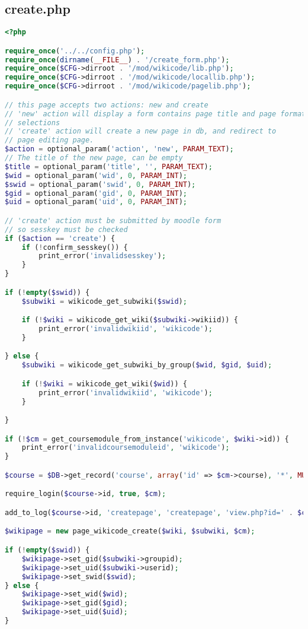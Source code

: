 \subsection{create.php}
\begin{lstlisting}[language=PHP]
<?php

require_once('../../config.php');
require_once(dirname(__FILE__) . '/create_form.php');
require_once($CFG->dirroot . '/mod/wikicode/lib.php');
require_once($CFG->dirroot . '/mod/wikicode/locallib.php');
require_once($CFG->dirroot . '/mod/wikicode/pagelib.php');

// this page accepts two actions: new and create
// 'new' action will display a form contains page title and page format
// selections
// 'create' action will create a new page in db, and redirect to
// page editing page.
$action = optional_param('action', 'new', PARAM_TEXT);
// The title of the new page, can be empty
$title = optional_param('title', '', PARAM_TEXT);
$wid = optional_param('wid', 0, PARAM_INT);
$swid = optional_param('swid', 0, PARAM_INT);
$gid = optional_param('gid', 0, PARAM_INT);
$uid = optional_param('uid', 0, PARAM_INT);

// 'create' action must be submitted by moodle form
// so sesskey must be checked
if ($action == 'create') {
    if (!confirm_sesskey()) {
        print_error('invalidsesskey');
    }
}

if (!empty($swid)) {
    $subwiki = wikicode_get_subwiki($swid);

    if (!$wiki = wikicode_get_wiki($subwiki->wikiid)) {
        print_error('invalidwikiid', 'wikicode');
    }

} else {
    $subwiki = wikicode_get_subwiki_by_group($wid, $gid, $uid);

    if (!$wiki = wikicode_get_wiki($wid)) {
        print_error('invalidwikiid', 'wikicode');
    }

}

if (!$cm = get_coursemodule_from_instance('wikicode', $wiki->id)) {
    print_error('invalidcoursemoduleid', 'wikicode');
}

$course = $DB->get_record('course', array('id' => $cm->course), '*', MUST_EXIST);

require_login($course->id, true, $cm);

add_to_log($course->id, 'createpage', 'createpage', 'view.php?id=' . $cm->id, $wiki->id);

$wikipage = new page_wikicode_create($wiki, $subwiki, $cm);

if (!empty($swid)) {
    $wikipage->set_gid($subwiki->groupid);
    $wikipage->set_uid($subwiki->userid);
    $wikipage->set_swid($swid);
} else {
    $wikipage->set_wid($wid);
    $wikipage->set_gid($gid);
    $wikipage->set_uid($uid);
}


\end{lstlisting}
